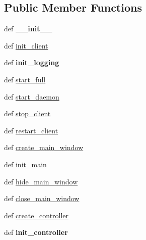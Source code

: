 \subsection*{Public Member Functions}
\begin{DoxyCompactItemize}
\item 
\hypertarget{classcommotion__client_1_1commotion__client_1_1CommotionClientApplication_af131eabc9f0007d5d8541228988767ca}{def {\bfseries \-\_\-\-\_\-init\-\_\-\-\_\-}}\label{classcommotion__client_1_1commotion__client_1_1CommotionClientApplication_af131eabc9f0007d5d8541228988767ca}

\item 
def \hyperlink{classcommotion__client_1_1commotion__client_1_1CommotionClientApplication_adbf0b01d9e64047a4ad7971161d457b1}{init\-\_\-client}
\item 
\hypertarget{classcommotion__client_1_1commotion__client_1_1CommotionClientApplication_aecf3bce1170d5ec27871002233b8a389}{def {\bfseries init\-\_\-logging}}\label{classcommotion__client_1_1commotion__client_1_1CommotionClientApplication_aecf3bce1170d5ec27871002233b8a389}

\item 
def \hyperlink{classcommotion__client_1_1commotion__client_1_1CommotionClientApplication_a61c21aa424a10a251b3a2902b3740bbe}{start\-\_\-full}
\item 
def \hyperlink{classcommotion__client_1_1commotion__client_1_1CommotionClientApplication_a640d7d7d8306a2e6ee7b66fa8281f5f5}{start\-\_\-daemon}
\item 
def \hyperlink{classcommotion__client_1_1commotion__client_1_1CommotionClientApplication_a63104a06ba20d9b679c22b542fd90c94}{stop\-\_\-client}
\item 
def \hyperlink{classcommotion__client_1_1commotion__client_1_1CommotionClientApplication_af40aa0ed2df54b7edb7f3e474b336a63}{restart\-\_\-client}
\item 
def \hyperlink{classcommotion__client_1_1commotion__client_1_1CommotionClientApplication_a726949d610a2bd566d1f3745b74c7b42}{create\-\_\-main\-\_\-window}
\item 
def \hyperlink{classcommotion__client_1_1commotion__client_1_1CommotionClientApplication_a1ed67f317a1ddd84b65ef39a848732bf}{init\-\_\-main}
\item 
def \hyperlink{classcommotion__client_1_1commotion__client_1_1CommotionClientApplication_a6b8f22fc6aaab6e6105f7832a7bf11b9}{hide\-\_\-main\-\_\-window}
\item 
def \hyperlink{classcommotion__client_1_1commotion__client_1_1CommotionClientApplication_ac3f5efd893879314eb1fbcf7e4d90192}{close\-\_\-main\-\_\-window}
\item 
def \hyperlink{classcommotion__client_1_1commotion__client_1_1CommotionClientApplication_a6afd07f83f02108c04a682120bd5a298}{create\-\_\-controller}
\item 
\hypertarget{classcommotion__client_1_1commotion__client_1_1CommotionClientApplication_ac6c092a34ad6d9174135769da24671f5}{def {\bfseries init\-\_\-controller}}\label{classcommotion__client_1_1commotion__client_1_1CommotionClientApplication_ac6c092a34ad6d9174135769da24671f5}


\end{DoxyCompactItemize}
